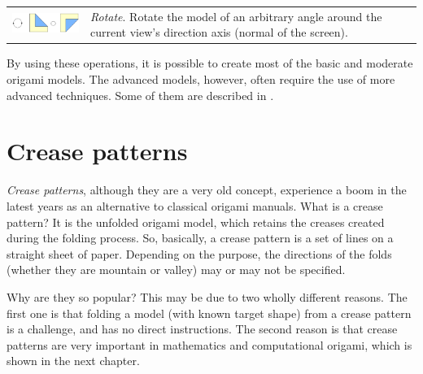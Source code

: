 \begin{savenotes}
\begin{longtable}{lp{9cm}}
\includegraphics[width=4cm]{images/folds_rotate} & \emph{Rotate}. Rotate the model of an arbitrary angle around the current view's direction axis (normal of the screen).\\
\end{longtable}
\end{savenotes}

By using these operations, it is possible to create most of the basic and moderate origami models. The advanced models, however, often require the use of more advanced techniques. Some of them are described in \cite{lang}.

\section{Crease patterns}
\label{sec:creasePatterns}
\emph{Crease patterns}, although they are a very old concept, experience a boom in the latest years as an alternative to classical origami manuals. What is a crease pattern? It is the unfolded origami model, which retains the creases created during the folding process. So, basically, a crease pattern is a set of lines on a straight sheet of paper. Depending on the purpose, the directions of the folds (whether they are mountain or valley) may or may not be specified.

Why are they so popular? This may be due to two wholly different reasons. The first one is that folding a model (with known target shape) from a crease pattern is a challenge, and has no direct instructions. The second reason is that crease patterns are very important in mathematics and computational origami, which is shown in the next chapter.
